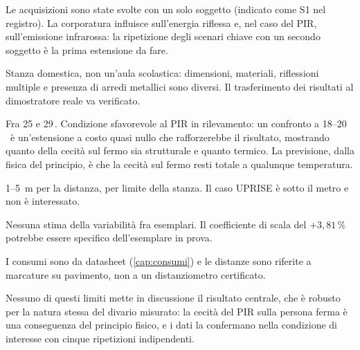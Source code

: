 \begin{description}[leftmargin=1.4em,style=nextline,itemsep=3pt]
  \item[Numero di soggetti] Le acquisizioni sono state svolte con un solo soggetto
    (indicato come S1 nel registro). La corporatura influisce sull'energia riflessa
    e, nel caso del PIR, sull'emissione infrarossa: la ripetizione degli scenari
    chiave con un secondo soggetto è la prima estensione da fare.
  \item[Ambiente] Stanza domestica, non un'aula scolastica: dimensioni, materiali,
    riflessioni multiple e presenza di arredi metallici sono diversi. Il
    trasferimento dei risultati al dimostratore reale va verificato.
  \item[Temperatura] Fra 25 e 29\,\celsius. Condizione sfavorevole al PIR in
    rilevamento: un confronto a 18--20\,\celsius\ è un'estensione a costo quasi
    nullo che rafforzerebbe il risultato, mostrando quanto della cecità sul fermo
    sia strutturale e quanto termico. La previsione, dalla fisica del principio, è
    che la cecità sul fermo resti totale a qualunque temperatura.
  \item[Range] 1--5~m per la distanza, per limite della stanza. Il caso UPRISE è
    sotto il metro e non è interessato.
  \item[Un solo esemplare per modello] Nessuna stima della variabilità fra esemplari.
    Il coefficiente di scala del $+3{,}81\,\%$ potrebbe essere specifico
    dell'esemplare in prova.
  \item[Assenza di strumentazione di misura] I consumi sono da datasheet
    (\cref{cap:consumi}) e le distanze sono riferite a marcature su pavimento, non a
    un distanziometro certificato.
\end{description}

Nessuno di questi limiti mette in discussione il risultato centrale, che è
robusto per la natura stessa del divario misurato: la cecità del PIR sulla persona
ferma è una conseguenza del principio fisico, e i dati la confermano nella
condizione di interesse con cinque ripetizioni indipendenti.
